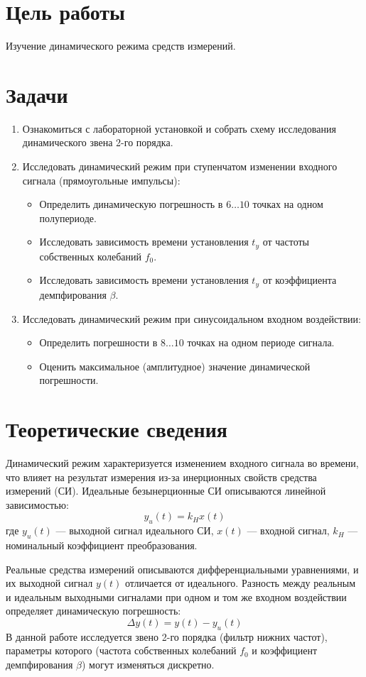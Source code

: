 \section*{Цель работы}
Изучение динамического режима средств измерений.

\section*{Задачи}
\begin{enumerate}
    \item Ознакомиться с лабораторной установкой и собрать схему исследования динамического звена 2-го порядка.
    \item Исследовать динамический режим при ступенчатом изменении входного сигнала (прямоугольные импульсы):
    \begin{itemize}
        \item Определить динамическую погрешность в $6\dots10$ точках на одном полупериоде.
        \item Исследовать зависимость времени установления $t_y$ от частоты собственных колебаний $f_0$.
        \item Исследовать зависимость времени установления $t_y$ от коэффициента демпфирования $\beta$.
    \end{itemize}
    \item Исследовать динамический режим при синусоидальном входном воздействии:
    \begin{itemize}
        \item Определить погрешности в $8\dots10$ точках на одном периоде сигнала.
        \item Оценить максимальное (амплитудное) значение динамической погрешности.
    \end{itemize}
\end{enumerate}

\section*{Теоретические сведения}
Динамический режим характеризуется изменением входного сигнала во времени, что влияет на результат измерения из-за инерционных свойств средства измерений (СИ).
Идеальные безынерционные СИ описываются линейной зависимостью:
$$y_u(t) = k_H x(t)$$
где $y_u(t)$ — выходной сигнал идеального СИ, $x(t)$ — входной сигнал, $k_H$ — номинальный коэффициент преобразования.

Реальные средства измерений описываются дифференциальными уравнениями, и их выходной сигнал $y(t)$ отличается от идеального. Разность между реальным и идеальным выходными сигналами при одном и том же входном воздействии определяет динамическую погрешность:
\begin{equation}
    \Delta y(t) = y(t) - y_u(t)
    \label{eq:dynamic_error}
\end{equation}
В данной работе исследуется звено 2-го порядка (фильтр нижних частот), параметры которого (частота собственных колебаний $f_0$ и коэффициент демпфирования $\beta$) могут изменяться дискретно.


